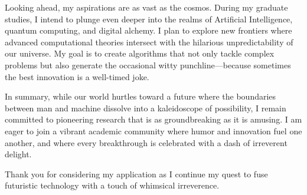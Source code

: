 Looking ahead, my aspirations are as vast as the cosmos. During my graduate studies, I intend to plunge even deeper into the realms of Artificial Intelligence, quantum computing, and digital alchemy. I plan to explore new frontiers where advanced computational theories intersect with the hilarious unpredictability of our universe. My goal is to create algorithms that not only tackle complex problems but also generate the occasional witty punchline—because sometimes the best innovation is a well-timed joke.

In summary, while our world hurtles toward a future where the boundaries between man and machine dissolve into a kaleidoscope of possibility, I remain committed to pioneering research that is as groundbreaking as it is amusing. I am eager to join a vibrant academic community where humor and innovation fuel one another, and where every breakthrough is celebrated with a dash of irreverent delight.

Thank you for considering my application as I continue my quest to fuse futuristic technology with a touch of whimsical irreverence.


